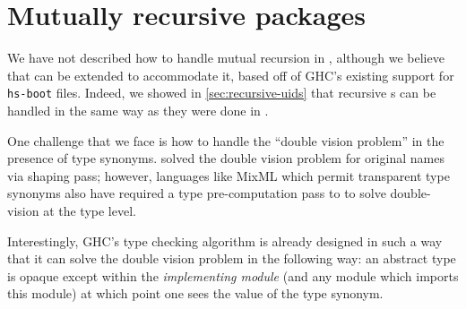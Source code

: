 



\section{Mutually recursive packages}

We have not described how to handle mutual recursion in \Backpack{},
although we believe that \Backpack{} can be extended to accommodate it,
based off of GHC's existing support for \verb|hs-boot| files.
Indeed, we showed in \cref{sec:recursive-uids} that recursive
\uid{}s can be handled in the same way as they were done in \OldBackpack{}.

One challenge that we face is how to handle the ``double vision
problem'' in the presence of type synonyms.  \OldBackpack{} solved the
double vision problem for original names via  shaping pass; however,
languages like MixML which permit transparent type synonyms also have
required a type pre-computation pass to to solve double-vision at the
type level.

Interestingly, GHC's type checking algorithm is already designed in
such a way that it can solve the double vision problem in the following
way: an abstract type is opaque except within the \emph{implementing
module} (and any module which imports this module) at which point one
sees the value of the type synonym.

